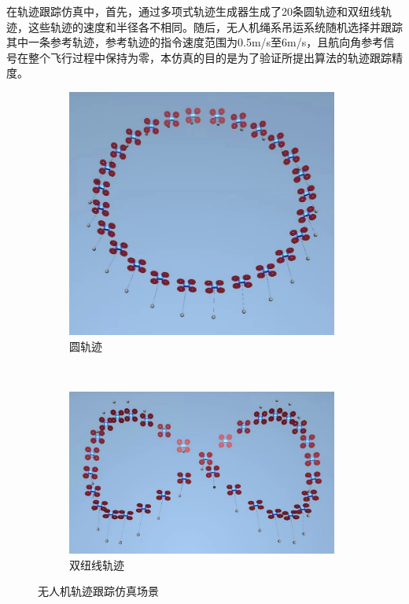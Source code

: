 \documentclass[lang=chs, degree=master, blindreview=false, winfonts=true]{yanputhesis}
\begin{document}
在轨迹跟踪仿真中，首先，通过多项式轨迹生成器生成了20条圆轨迹和双纽线轨迹，这些轨迹的速度和半径各不相同。随后，无人机绳系吊运系统随机选择并跟踪其中一条参考轨迹，参考轨迹的指令速度范围为0.5m/s至6m/s，且航向角参考信号在整个飞行过程中保持为零，本仿真的目的是为了验证所提出算法的轨迹跟踪精度。
\begin{figure}[hbt!]
	\centering
	\begin{subfigure}[t]{0.9\textwidth}
		\centering
		\includegraphics[width=0.98\textwidth]{picture/kk/yuan.jpg}
		\vspace{-0.2cm}
		\caption{圆轨迹}
		\label{yuana}
	\end{subfigure}\\[1.2ex] %
	\begin{subfigure}[t]{0.9\textwidth}
		\centering
		\includegraphics[width=0.98\textwidth]{picture/kk/bazi.jpg}
		\vspace{-0.2cm}
		\caption{双纽线轨迹}
		\label{bazib}
	\end{subfigure}
	\caption{无人机轨迹跟踪仿真场景}
	\label{mujoco}
\end{figure}
\end{document}
